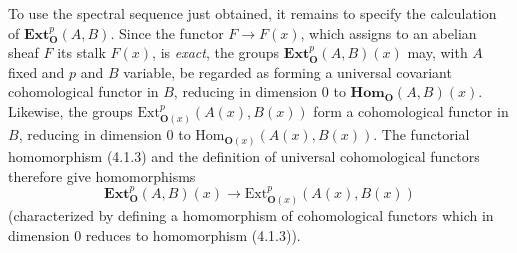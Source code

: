 To use the spectral sequence just obtained, it remains to specify the
calculation of $\mathbf{Ext}_{\mathbf O}^p(A,B)$. Since the functor
$F\to F(x)$, which assigns to an abelian sheaf $F$ its stalk $F(x)$,
is \textit{exact}, the groups $\mathbf{Ext}_{\mathbf O}^p(A,B)(x)$ may, with $A$ fixed and $p$
and $B$ variable, be regarded as forming a universal covariant cohomological
functor in $B$, reducing in dimension 0 to $\mathbf{Hom}_{\mathbf O}(A,B)(x)$. Likewise,
the groups $\mathrm{Ext}_{{\mathbf O}(x)}^p(A(x),B(x))$ form a cohomological functor in
$B$, reducing in dimension 0 to
$\mathrm{Hom}_{{\mathbf O}(x)}(A(x),B(x))$. The functorial homomorphism (4.1.3) and the
definition of universal cohomological functors therefore give homomorphisms
\[
\tag{4.2.8}
\mathbf{Ext}_{\mathbf O}^p(A,B)(x)\to
\mathrm{Ext}_{{\mathbf O}(x)}^p(A(x),B(x))
\]
(characterized by defining a homomorphism of cohomological functors which in
dimension 0 reduces to homomorphism (4.1.3)).

